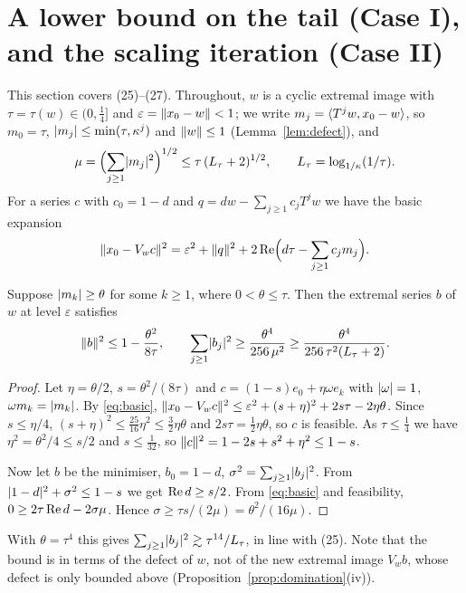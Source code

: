 \section{A lower bound on the tail (Case I), and the scaling iteration (Case II)}
\label{sec:scaling}

This section covers \paper{} (25)--(27). Throughout, $w$ is a cyclic extremal image with
$\tau=\tau(w)\in(0,\frac14]$ and $\varepsilon=\lVert x_0-w\rVert<1$; we write
$m_j=\langle T^jw,x_0-w\rangle$, so $m_0=\tau$, $\lvert m_j\rvert\le\min(\tau,\kappa^j)$ and $\lVert w\rVert\le1$
(Lemma~\ref{lem:defect}), and
\[
\mu=\Bigl(\sum_{j\ge1}\lvert m_j\rvert^2\Bigr)^{1/2}\le\tau\,(L_\tau+2)^{1/2},\qquad
L_\tau=\log_{1/\kappa}(1/\tau).
\]
For a series $c$ with $c_0=1-d$ and $q=dw-\sum_{j\ge1}c_jT^jw$ we have the basic expansion
\begin{equation}\label{eq:basic}
\lVert x_0-V_wc\rVert^2=\varepsilon^2+\lVert q\rVert^2+2\operatorname{Re}\Bigl(d\tau-\sum_{j\ge1}c_jm_j\Bigr).
\end{equation}

\begin{proposition}[Case I]\label{prop:caseI}\stproved{}
Suppose $\lvert m_k\rvert\ge\theta$ for some $k\ge1$, where $0<\theta\le\tau$. Then the extremal series
$b$ of $w$ at level $\varepsilon$ satisfies
\[
\lVert b\rVert^2\le1-\frac{\theta^2}{8\tau},\qquad
\sum_{j\ge1}\lvert b_j\rvert^2\ge\frac{\theta^4}{256\,\mu^2}\ge\frac{\theta^4}{256\,\tau^2(L_\tau+2)} .
\]
\end{proposition}
\begin{proof}
Let $\eta=\theta/2$, $s=\theta^2/(8\tau)$ and $c=(1-s)e_0+\eta\omega e_k$ with $\lvert \omega\rvert=1$,
$\omega m_k=\lvert m_k\rvert$. By \eqref{eq:basic},
$\lVert x_0-V_wc\rVert^2\le\varepsilon^2+(s+\eta)^2+2s\tau-2\eta\theta$. Since $s\le\eta/4$,
$(s+\eta)^2\le\frac{25}{16}\eta^2\le\frac32\eta\theta$ and $2s\tau=\frac12\eta\theta$, so $c$ is
feasible. As $\tau\le\frac14$ we have $\eta^2=\theta^2/4\le s/2$ and $s\le\frac1{32}$, so
$\lVert c\rVert^2=1-2s+s^2+\eta^2\le1-s$.

Now let $b$ be the minimiser, $b_0=1-d$, $\sigma^2=\sum_{j\ge1}\lvert b_j\rvert^2$. From
$\lvert 1-d\rvert^2+\sigma^2\le1-s$ we get $\operatorname{Re} d\ge s/2$. From \eqref{eq:basic} and feasibility,
$0\ge2\tau\operatorname{Re} d-2\sigma\mu$. Hence $\sigma\ge\tau s/(2\mu)=\theta^2/(16\mu)$.
\end{proof}

With $\theta=\tau^4$ this gives $\sum_{j\ge1}\lvert b_j\rvert^2\gtrsim\tau^{14}/L_\tau$, in line with
\paper{} (25). Note that the bound is in terms of the defect of $w$, not of the new extremal
image $V_wb$, whose defect is only bounded above (Proposition~\ref{prop:domination}(iv)).


